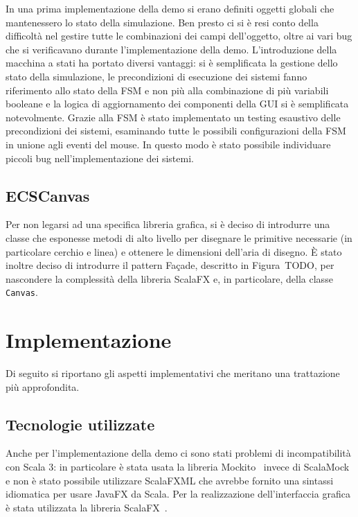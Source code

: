 In una prima implementazione della demo si erano definiti oggetti globali che mantenessero lo stato della simulazione.
Ben presto ci si è resi conto della difficoltà nel gestire tutte le combinazioni dei campi dell'oggetto, oltre
ai vari bug che si verificavano durante l'implementazione della demo.
L'introduzione della macchina a stati ha portato diversi vantaggi: si è semplificata la gestione dello
stato della simulazione, le precondizioni di esecuzione dei sistemi fanno riferimento allo stato della FSM e non più
alla combinazione di più variabili booleane e la logica di aggiornamento dei componenti della GUI si è semplificata
notevolmente.
Grazie alla FSM è stato implementato un testing esaustivo delle precondizioni dei sistemi, esaminando tutte
le possibili configurazioni della FSM in unione agli eventi del mouse.
In questo modo è stato possibile individuare piccoli bug nell'implementazione dei sistemi.

\subsection{ECSCanvas}\label{subsec:ecscanvas}
Per non legarsi ad una specifica libreria grafica, si è deciso di introdurre una classe che esponesse metodi di alto livello
per disegnare le primitive necessarie (in particolare cerchio e linea) e ottenere le dimensioni dell'aria di disegno.
È stato inoltre deciso di introdurre il pattern Façade, descritto in Figura~TODO, per nascondere la complessità della libreria ScalaFX e,
in particolare, della classe \texttt{Canvas}.

\section{Implementazione}\label{sec:demo-implementazione}
Di seguito si riportano gli aspetti implementativi che meritano una trattazione più approfondita.

\subsection{Tecnologie utilizzate}\label{subsec:demo-tecnologie-utilizzate}
Anche per l'implementazione della demo ci sono stati problemi di incompatibilità con Scala 3:
in particolare è stata usata la libreria Mockito~\cite{mockito} invece di ScalaMock e non è stato possibile utilizzare
ScalaFXML che avrebbe fornito una sintassi idiomatica per usare JavaFX da Scala\@.
Per la realizzazione dell'interfaccia grafica è stata utilizzata la libreria ScalaFX~\cite{scalafx}\@.

